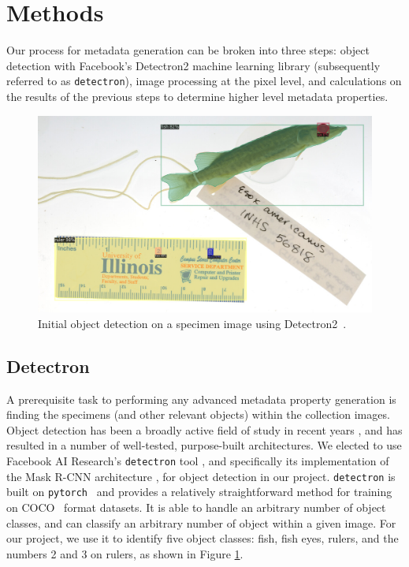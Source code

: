\documentclass[conference]{IEEEtran}
\begin{document}
\section{Methods}
Our process for metadata generation can be broken into three steps: object detection with Facebook's Detectron2 machine learning library (subsequently referred to as \verb|detectron|), image processing at the pixel level, and calculations on the results of the previous steps to determine higher level metadata properties.

\begin{figure}[b]
  \centering
  \includegraphics[width=.90\linewidth]{images/teaser2_crop}
  \caption{Initial object detection on a specimen image using Detectron2~\cite{wu2019detectron2}.}
  \label{fig:teaser}
\end{figure}

\subsection{Detectron}
A prerequisite task to performing any advanced metadata property generation
is finding the specimens (and other relevant objects) within the collection
images. Object detection has been a broadly active field of study in recent
years \cite{zou2019object}, and has resulted in a number of well-tested, purpose-built architectures. We elected to use Facebook AI Research's \verb|detectron| tool \cite{wu2019detectron2}, and specifically its implementation of the Mask R-CNN architecture \cite{he2018mask}, for object detection in our project.
\verb|detectron| is built on \verb|pytorch|~\cite{NEURIPS2019_9015} and provides a relatively straightforward method for training on COCO~\cite{DBLP:journals/corr/LinMBHPRDZ14} format datasets. It is able to handle an arbitrary number of object classes, and can classify an arbitrary number of object within a given image. 
For our project, we use it to identify five object classes: fish, fish eyes, rulers, and the numbers 2 and 3 on rulers,
as shown in Figure \ref{fig:teaser}.
\end{document}
